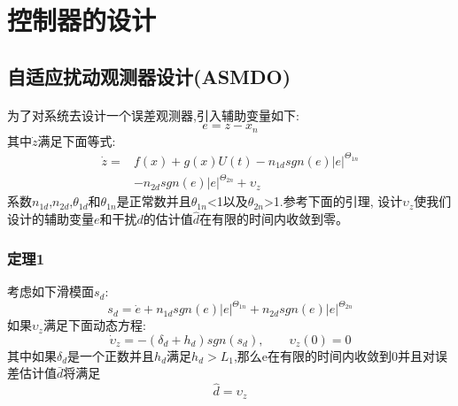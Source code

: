 \documentclass{cjc}
\begin{document}
    
    
\section{控制器的设计}

\subsection{自适应扰动观测器设计(ASMDO)}
  \paragraph{}为了对系统去设计一个误差观测器,引入辅助变量如下:
  \begin{equation}
    e = z - x_n  
  \end{equation}
  其中$\dot{z}$满足下面等式:
  \begin{eqnarray}
    \dot{z} = &f(x) + g(x)U(t) - n_{1d} sgn(e) \left|e \right|^{\varTheta_{1n}} \nonumber \\
    & -n_{2d} sgn(e)\left|e\right|^{\varTheta_{2n}} +\upsilon_z 
  \end{eqnarray}
  系数$n_{1d}$,$n_{2d}$,$\theta _{1d}$和$\theta _{1n}$是正常数并且$\theta _{1n}$<1以及$\theta _{2n}$>1.参考下面的引理,
  设计$\upsilon_z$使我们设计的辅助变量$e$和干扰$d$的估计值$\hat{d}$在有限的时间内收敛到零。

\subsubsection{定理1}
  考虑如下滑模面$s_d$:
  \begin{equation}
    s_d = \dot{e} + n_{1d} sgn(e) \left| e \right|^{\varTheta_{1n}} + n_{2d} sgn(e)\left|e\right|^{\varTheta_{2n}} 
  \end{equation}
  如果$\upsilon_z$满足下面动态方程:
  \begin{equation}
    \dot{\upsilon}_z = -(\delta_d + h_d) sgn(s_d),\qquad \upsilon_z(0) = 0 
  \end{equation}
  其中如果$\delta_d$是一个正数并且$h_d$满足$h_d>L_1$,那么e在有限的时间内收敛到0并且对误差估计值$\bar{d}$将满足\:
  \begin{equation}
    \hat{d} = \upsilon_z
  \end{equation} 
  
\end{document}
